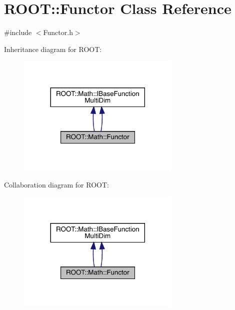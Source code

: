 \hypertarget{classROOT_1_1Math_1_1Functor}{}\section{R\+O\+OT\+:\+:Functor Class Reference}
\label{classROOT_1_1Math_1_1Functor}


{\ttfamily \#include $<$Functor.\+h$>$}



Inheritance diagram for R\+O\+OT\+:\nopagebreak
\begin{figure}[H]
\begin{center}
\leavevmode
\includegraphics[width=221pt]{dd/d90/classROOT_1_1Math_1_1Functor__inherit__graph}
\end{center}
\end{figure}


Collaboration diagram for R\+O\+OT\+:\nopagebreak
\begin{figure}[H]
\begin{center}
\leavevmode
\includegraphics[width=221pt]{da/d07/classROOT_1_1Math_1_1Functor__coll__graph}
\end{center}
\end{figure}
